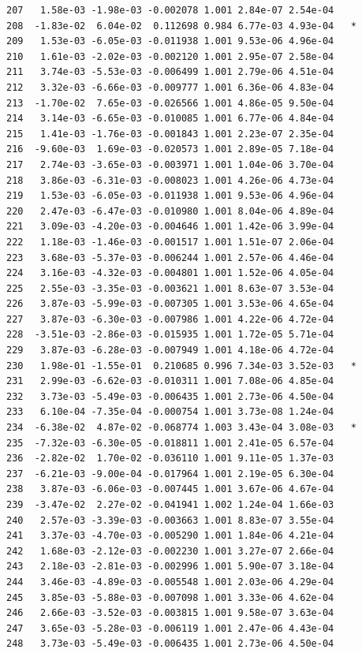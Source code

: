 \documentclass[
  letterpaper,
  DIV=11,
  numbers=noendperiod]{scrartcl}
\begin{document}
\begin{verbatim}
207   1.58e-03 -1.98e-03 -0.002078 1.001 2.84e-07 2.54e-04    
208  -1.83e-02  6.04e-02  0.112698 0.984 6.77e-03 4.93e-04   *
209   1.53e-03 -6.05e-03 -0.011938 1.001 9.53e-06 4.96e-04    
210   1.61e-03 -2.02e-03 -0.002120 1.001 2.95e-07 2.58e-04    
211   3.74e-03 -5.53e-03 -0.006499 1.001 2.79e-06 4.51e-04    
212   3.32e-03 -6.66e-03 -0.009777 1.001 6.36e-06 4.83e-04    
213  -1.70e-02  7.65e-03 -0.026566 1.001 4.86e-05 9.50e-04    
214   3.14e-03 -6.65e-03 -0.010085 1.001 6.77e-06 4.84e-04    
215   1.41e-03 -1.76e-03 -0.001843 1.001 2.23e-07 2.35e-04    
216  -9.60e-03  1.69e-03 -0.020573 1.001 2.89e-05 7.18e-04    
217   2.74e-03 -3.65e-03 -0.003971 1.001 1.04e-06 3.70e-04    
218   3.86e-03 -6.31e-03 -0.008023 1.001 4.26e-06 4.73e-04    
219   1.53e-03 -6.05e-03 -0.011938 1.001 9.53e-06 4.96e-04    
220   2.47e-03 -6.47e-03 -0.010980 1.001 8.04e-06 4.89e-04    
221   3.09e-03 -4.20e-03 -0.004646 1.001 1.42e-06 3.99e-04    
222   1.18e-03 -1.46e-03 -0.001517 1.001 1.51e-07 2.06e-04    
223   3.68e-03 -5.37e-03 -0.006244 1.001 2.57e-06 4.46e-04    
224   3.16e-03 -4.32e-03 -0.004801 1.001 1.52e-06 4.05e-04    
225   2.55e-03 -3.35e-03 -0.003621 1.001 8.63e-07 3.53e-04    
226   3.87e-03 -5.99e-03 -0.007305 1.001 3.53e-06 4.65e-04    
227   3.87e-03 -6.30e-03 -0.007986 1.001 4.22e-06 4.72e-04    
228  -3.51e-03 -2.86e-03 -0.015935 1.001 1.72e-05 5.71e-04    
229   3.87e-03 -6.28e-03 -0.007949 1.001 4.18e-06 4.72e-04    
230   1.98e-01 -1.55e-01  0.210685 0.996 7.34e-03 3.52e-03   *
231   2.99e-03 -6.62e-03 -0.010311 1.001 7.08e-06 4.85e-04    
232   3.73e-03 -5.49e-03 -0.006435 1.001 2.73e-06 4.50e-04    
233   6.10e-04 -7.35e-04 -0.000754 1.001 3.73e-08 1.24e-04    
234  -6.38e-02  4.87e-02 -0.068774 1.003 3.43e-04 3.08e-03   *
235  -7.32e-03 -6.30e-05 -0.018811 1.001 2.41e-05 6.57e-04    
236  -2.82e-02  1.70e-02 -0.036110 1.001 9.11e-05 1.37e-03    
237  -6.21e-03 -9.00e-04 -0.017964 1.001 2.19e-05 6.30e-04    
238   3.87e-03 -6.06e-03 -0.007445 1.001 3.67e-06 4.67e-04    
239  -3.47e-02  2.27e-02 -0.041941 1.002 1.24e-04 1.66e-03    
240   2.57e-03 -3.39e-03 -0.003663 1.001 8.83e-07 3.55e-04    
241   3.37e-03 -4.70e-03 -0.005290 1.001 1.84e-06 4.21e-04    
242   1.68e-03 -2.12e-03 -0.002230 1.001 3.27e-07 2.66e-04    
243   2.18e-03 -2.81e-03 -0.002996 1.001 5.90e-07 3.18e-04    
244   3.46e-03 -4.89e-03 -0.005548 1.001 2.03e-06 4.29e-04    
245   3.85e-03 -5.88e-03 -0.007098 1.001 3.33e-06 4.62e-04    
246   2.66e-03 -3.52e-03 -0.003815 1.001 9.58e-07 3.63e-04    
247   3.65e-03 -5.28e-03 -0.006119 1.001 2.47e-06 4.43e-04    
248   3.73e-03 -5.49e-03 -0.006435 1.001 2.73e-06 4.50e-04    

\end{verbatim}
\end{document}
